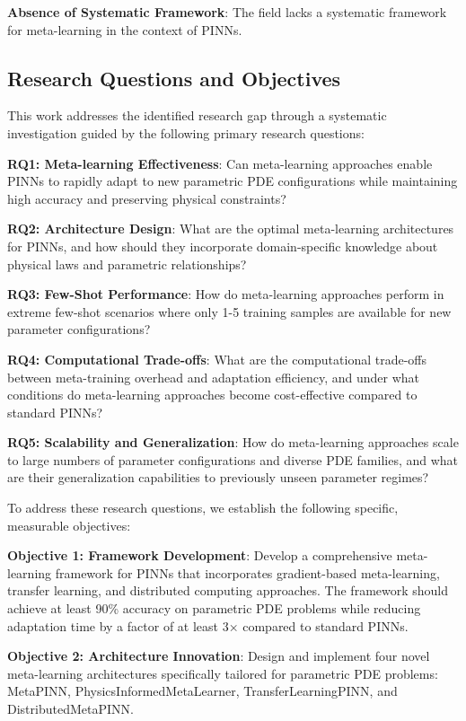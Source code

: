 \documentclass[review]{elsarticle}
\begin{document}
\textbf{Absence of Systematic Framework}: The field lacks a systematic framework for meta-learning in the context of PINNs.

\subsection{Research Questions and Objectives}

This work addresses the identified research gap through a systematic investigation guided by the following primary research questions:

\textbf{RQ1: Meta-learning Effectiveness}: Can meta-learning approaches enable PINNs to rapidly adapt to new parametric PDE configurations while maintaining high accuracy and preserving physical constraints?

\textbf{RQ2: Architecture Design}: What are the optimal meta-learning architectures for PINNs, and how should they incorporate domain-specific knowledge about physical laws and parametric relationships?

\textbf{RQ3: Few-Shot Performance}: How do meta-learning approaches perform in extreme few-shot scenarios where only 1-5 training samples are available for new parameter configurations?

\textbf{RQ4: Computational Trade-offs}: What are the computational trade-offs between meta-training overhead and adaptation efficiency, and under what conditions do meta-learning approaches become cost-effective compared to standard PINNs?

\textbf{RQ5: Scalability and Generalization}: How do meta-learning approaches scale to large numbers of parameter configurations and diverse PDE families, and what are their generalization capabilities to previously unseen parameter regimes?

To address these research questions, we establish the following specific, measurable objectives:

\textbf{Objective 1: Framework Development}: Develop a comprehensive meta-learning framework for PINNs that incorporates gradient-based meta-learning, transfer learning, and distributed computing approaches. The framework should achieve at least 90\% accuracy on parametric PDE problems while reducing adaptation time by a factor of at least 3× compared to standard PINNs.

\textbf{Objective 2: Architecture Innovation}: Design and implement four novel meta-learning architectures specifically tailored for parametric PDE problems: MetaPINN, PhysicsInformedMetaLearner, TransferLearningPINN, and DistributedMetaPINN.
\end{document}

